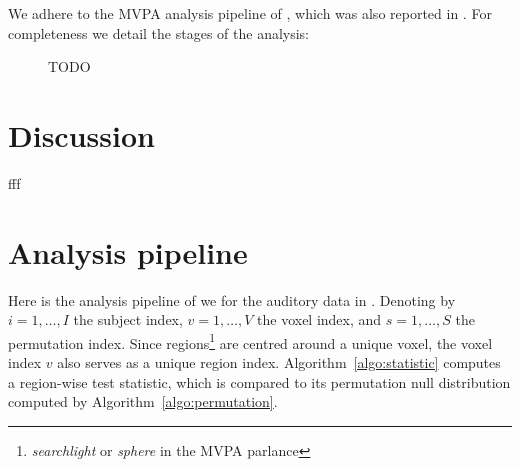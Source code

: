 \documentclass[12pt,a4paper]{article}
\begin{document}
We adhere to the MVPA analysis pipeline of \cite{stelzer_statistical_2013}, which was also reported in \cite{gilron_quantifying_2016}. 
For completeness we detail the stages of the analysis:






\begin{figure}[h]
\centering
\caption{
	\label{fig:read_data}
	TODO}
\end{figure}








\section{Discussion}
\label{sec:discussion}



fff


















\appendix


\newpage

\section{Analysis pipeline}
\label{apx:analysis}

Here is the analysis pipeline of \cite{stelzer_statistical_2013} we for the auditory data in \cite{gilron_quantifying_2016}.
Denoting by 
$i=1,\dots,I$ the subject index, 
$v=1,\dots,V$ the voxel index, and 
$s = 1,\dots,S$ the permutation index. 
Since regions\footnote{\emph{searchlight} or \emph{sphere} in the MVPA parlance} are centred around a unique voxel, the voxel index $v$ also serves as a unique region index.
Algorithm~\ref{algo:statistic} computes a region-wise test statistic, which is compared to its permutation null distribution computed by Algorithm~\ref{algo:permutation}.
\end{document}
